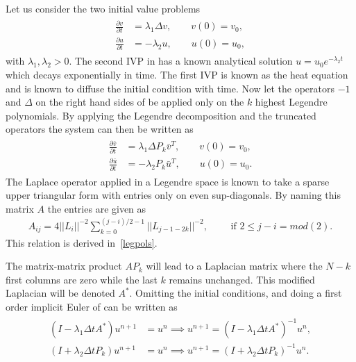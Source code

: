 Let us consider the two initial value problems 
\begin{align}
    \begin{split}
    \frac{\partial v }{\partial t} &=  \lambda_1\Delta v, \qquad v(0) = v_0, \\
    \frac{\partial u }{\partial t} &= -\lambda_2u, \qquad u(0) = u_0,
    \end{split}
    \label{eq:ivps}
\end{align}
with $\lambda_1,\lambda_2 > 0$.
The second IVP in  has a known analytical solution 
$u = u_0e^{-\lambda_2 t}$ which decays exponentially in time. The first IVP is known 
as the heat equation and is known to diffuse the initial condition with time. 
Now let the operators $-1$ and $\Delta$ on the right hand sides of 
be applied only on the $k$ highest Legendre polynomials. By applying the Legendre decomposition
and the truncated operators the system can then be written as 
%
\begin{align}
    \begin{split}
    \frac{\partial \bar v }{\partial t}
    &= \lambda_1 \Delta P_{k}\bar v^T , \qquad v(0) = v_0, \\
        \frac{\partial \bar u }{\partial t} 
        &=   -\lambda_2P_{k}\bar u^T , \qquad u(0) = u_0.
    \label{eq:ivps2}
    \end{split}
\end{align}
%
The Laplace operator applied in a Legendre space is known to take a sparse upper triangular form
with entries only on even sup-diagonals. By naming this matrix $A$ the entries are given as 
%
\begin{align}
    A_{ij} = 4||L_i||^{-2} \sum_{k=0}^{(j-i)/2-1} ||L_{j-1-2k}||^{-2}, \qquad \text{ if } 2 \le j-i = mod(2). 
    \label{Laplace-entries}
\end{align}
%
This relation is derived in~\ref{legpols}.

The matrix-matrix product $AP_{k}$ will lead to a Laplacian matrix where the $N-k$ first columns are zero
while the last $k$ remains unchanged. This modified Laplacian will be denoted $A^*$.
Omitting the initial conditions, and doing a first order implicit 
Euler of  can be written as 
%
\begin{align}
    \begin{split}
    (I-\lambda_1\Delta t A^*)u^{n+1} &= u^n  \implies u^{n+1}= (I-  \lambda_1\Delta t A^*)^{-1}u^{n}, \\
    (I+\lambda_2\Delta t P_{k})u^{n+1} &= u^n \implies u^{n+1} = (I+\lambda_2\Delta t P_{k})^{-1}u^{n}.
    \label{eq:timestep}
    \end{split}
\end{align}
%

